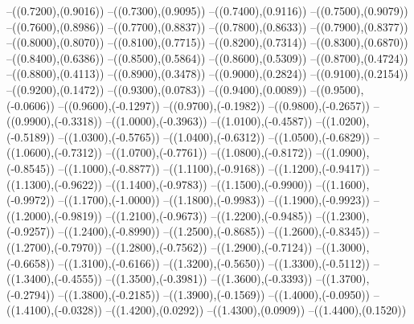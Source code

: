 {	--({\sx*(0.7200)},{\sy*(0.9016)})
	--({\sx*(0.7300)},{\sy*(0.9095)})
	--({\sx*(0.7400)},{\sy*(0.9116)})
	--({\sx*(0.7500)},{\sy*(0.9079)})
	--({\sx*(0.7600)},{\sy*(0.8986)})
	--({\sx*(0.7700)},{\sy*(0.8837)})
	--({\sx*(0.7800)},{\sy*(0.8633)})
	--({\sx*(0.7900)},{\sy*(0.8377)})
	--({\sx*(0.8000)},{\sy*(0.8070)})
	--({\sx*(0.8100)},{\sy*(0.7715)})
	--({\sx*(0.8200)},{\sy*(0.7314)})
	--({\sx*(0.8300)},{\sy*(0.6870)})
	--({\sx*(0.8400)},{\sy*(0.6386)})
	--({\sx*(0.8500)},{\sy*(0.5864)})
	--({\sx*(0.8600)},{\sy*(0.5309)})
	--({\sx*(0.8700)},{\sy*(0.4724)})
	--({\sx*(0.8800)},{\sy*(0.4113)})
	--({\sx*(0.8900)},{\sy*(0.3478)})
	--({\sx*(0.9000)},{\sy*(0.2824)})
	--({\sx*(0.9100)},{\sy*(0.2154)})
	--({\sx*(0.9200)},{\sy*(0.1472)})
	--({\sx*(0.9300)},{\sy*(0.0783)})
	--({\sx*(0.9400)},{\sy*(0.0089)})
	--({\sx*(0.9500)},{\sy*(-0.0606)})
	--({\sx*(0.9600)},{\sy*(-0.1297)})
	--({\sx*(0.9700)},{\sy*(-0.1982)})
	--({\sx*(0.9800)},{\sy*(-0.2657)})
	--({\sx*(0.9900)},{\sy*(-0.3318)})
	--({\sx*(1.0000)},{\sy*(-0.3963)})
	--({\sx*(1.0100)},{\sy*(-0.4587)})
	--({\sx*(1.0200)},{\sy*(-0.5189)})
	--({\sx*(1.0300)},{\sy*(-0.5765)})
	--({\sx*(1.0400)},{\sy*(-0.6312)})
	--({\sx*(1.0500)},{\sy*(-0.6829)})
	--({\sx*(1.0600)},{\sy*(-0.7312)})
	--({\sx*(1.0700)},{\sy*(-0.7761)})
	--({\sx*(1.0800)},{\sy*(-0.8172)})
	--({\sx*(1.0900)},{\sy*(-0.8545)})
	--({\sx*(1.1000)},{\sy*(-0.8877)})
	--({\sx*(1.1100)},{\sy*(-0.9168)})
	--({\sx*(1.1200)},{\sy*(-0.9417)})
	--({\sx*(1.1300)},{\sy*(-0.9622)})
	--({\sx*(1.1400)},{\sy*(-0.9783)})
	--({\sx*(1.1500)},{\sy*(-0.9900)})
	--({\sx*(1.1600)},{\sy*(-0.9972)})
	--({\sx*(1.1700)},{\sy*(-1.0000)})
	--({\sx*(1.1800)},{\sy*(-0.9983)})
	--({\sx*(1.1900)},{\sy*(-0.9923)})
	--({\sx*(1.2000)},{\sy*(-0.9819)})
	--({\sx*(1.2100)},{\sy*(-0.9673)})
	--({\sx*(1.2200)},{\sy*(-0.9485)})
	--({\sx*(1.2300)},{\sy*(-0.9257)})
	--({\sx*(1.2400)},{\sy*(-0.8990)})
	--({\sx*(1.2500)},{\sy*(-0.8685)})
	--({\sx*(1.2600)},{\sy*(-0.8345)})
	--({\sx*(1.2700)},{\sy*(-0.7970)})
	--({\sx*(1.2800)},{\sy*(-0.7562)})
	--({\sx*(1.2900)},{\sy*(-0.7124)})
	--({\sx*(1.3000)},{\sy*(-0.6658)})
	--({\sx*(1.3100)},{\sy*(-0.6166)})
	--({\sx*(1.3200)},{\sy*(-0.5650)})
	--({\sx*(1.3300)},{\sy*(-0.5112)})
	--({\sx*(1.3400)},{\sy*(-0.4555)})
	--({\sx*(1.3500)},{\sy*(-0.3981)})
	--({\sx*(1.3600)},{\sy*(-0.3393)})
	--({\sx*(1.3700)},{\sy*(-0.2794)})
	--({\sx*(1.3800)},{\sy*(-0.2185)})
	--({\sx*(1.3900)},{\sy*(-0.1569)})
	--({\sx*(1.4000)},{\sy*(-0.0950)})
	--({\sx*(1.4100)},{\sy*(-0.0328)})
	--({\sx*(1.4200)},{\sy*(0.0292)})
	--({\sx*(1.4300)},{\sy*(0.0909)})
	--({\sx*(1.4400)},{\sy*(0.1520)})
}
